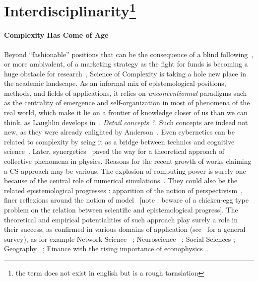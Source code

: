 \section*{Interdisciplinarity\footnote{the term does not exist in english but is a rough tarnslation}}



\paragraph{Complexity Has Come of Age}


Beyond ``fashionable'' positions that can be the consequence of a blind following~\cite{dirk1999measure}, or more ambivalent, of a marketing strategy as the fight for funds is becoming a huge obstacle for research~\cite{bollen2014funding}, Science of Complexity is taking a hole new place in the academic landscape.
As an informal mix of epistemological positions, methods, and fields of applications, it relies on \emph{unconventionnal} paradigms such as the centrality of emergence and self-organization in most of phenomena of the real world, which make it lie on a frontier of knowledge closer of us than we can think, as Laughlin develops in~\cite{laughlin2006different}. \textit{Detail concepts ?}. Such concepts are indeed not new, as they were already enlighted by Anderson~\cite{anderson1972more}. Even cybernetics can be related to complexity by seing it as a bridge between technics and cognitive science~\cite{wiener1948cybernetics}. Later, synergetics~\cite{haken1980synergetics} paved the way for a theoretical approach of collective phenomena in physics. Reasons for the recent growth of works claiming a CS approach may be various. The explosion of computing power is surely one because of the central role of numerical simulations~\cite{varenne2010simulations}. They could also be the related epistemological progresses : apparition of the notion of perspectivism~\cite{giere2010scientific}, finer reflexions around the notion of model~\cite{varenne2013modeliser} [note : beware of a chicken-egg type problem on the relation between scientific and epistemological progress]. The theoretical and empirical potentialities of such approach play surely a role in their success, as confirmed in various domains of application (see~\cite{newman2011complex} for a general survey), as for example Network Science~\cite{barabasi2002linked} ; Neuroscience~\cite{koch1999complexity} ; Social Sciences  ; Geography~\cite{manson2001simplifying}\cite{pumain1997pour} ; Finance with the rising importance of econophysics~\cite{stanley1999econophysics}.




